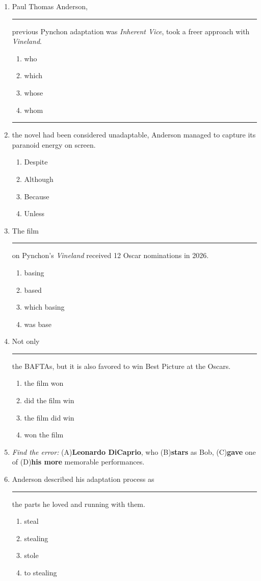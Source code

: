 \documentclass[10pt,a4paper]{article}
\begin{document}
\begin{enumerate}[label=\textbf{\arabic*.}, leftmargin=*]

\item Paul Thomas Anderson, \rule{2cm}{0.4pt} previous Pynchon
adaptation was \emph{Inherent Vice}, took a freer approach with
\emph{Vineland}.
\begin{enumerate}[label=(\Alph*)]
\item who \item which \item whose \item whom
\end{enumerate}

\item \rule{2cm}{0.4pt} the novel had been considered unadaptable,
Anderson managed to capture its paranoid energy on screen.
\begin{enumerate}[label=(\Alph*)]
\item Despite \item Although \item Because \item Unless
\end{enumerate}

\item The film \rule{2cm}{0.4pt} on Pynchon's \emph{Vineland}
received 12 Oscar nominations in 2026.
\begin{enumerate}[label=(\Alph*)]
\item basing \item based \item which basing \item was base
\end{enumerate}

\item Not only \rule{2cm}{0.4pt} the BAFTAs, but it is also
favored to win Best Picture at the Oscars.
\begin{enumerate}[label=(\Alph*)]
\item the film won
\item did the film win
\item the film did win
\item won the film
\end{enumerate}

\item \textit{Find the error:}
(A)\textbf{Leonardo DiCaprio}, who (B)\textbf{stars} as Bob,
(C)\textbf{gave} one of (D)\textbf{his more} memorable performances.

\item Anderson described his adaptation process as
\rule{2cm}{0.4pt} the parts he loved and running with them.
\begin{enumerate}[label=(\Alph*)]
\item steal \item stealing \item stole \item to stealing
\end{enumerate}


\end{enumerate}
\end{document}
